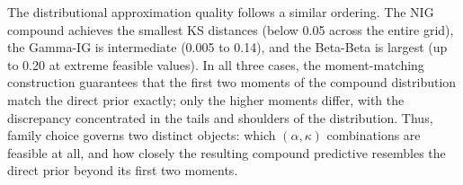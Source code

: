 The distributional approximation quality follows a similar ordering. The NIG
compound achieves the smallest KS distances (below 0.05 across the entire
grid), the Gamma-IG is intermediate (0.005 to 0.14), and the Beta-Beta is
largest (up to 0.20 at extreme feasible values). In all three cases, the
moment-matching construction guarantees that the first two moments of the
compound distribution match the direct prior exactly; only the higher moments
differ, with the discrepancy concentrated in the tails and shoulders of the
distribution. Thus, family choice governs two distinct objects: which
$(\alpha,\kappa)$ combinations are feasible at all, and how closely the resulting
compound predictive resembles the direct prior beyond its first two moments.
